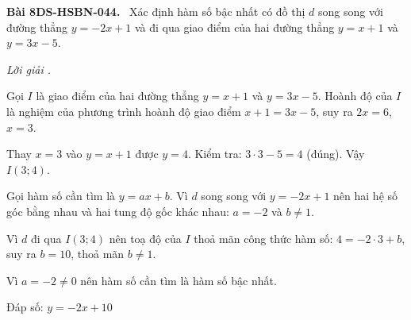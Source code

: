 \documentclass[12pt,a4paper]{article}
\newenvironment{problem}[1][]{\par\medskip\noindent\textbf{Bài #1.}\ }{\par}
\newenvironment{solution}[1][]{\par\noindent\textit{Lời giải #1.}\par}{\par}
\begin{document}
\begin{problem}[8DS-HSBN-044]
Xác định hàm số bậc nhất có đồ thị $d$ song song với đường thẳng $y = -2x + 1$ và đi qua giao điểm của hai đường thẳng $y = x + 1$ và $y = 3x - 5$.

\begin{solution}
Gọi $I$ là giao điểm của hai đường thẳng $y = x + 1$ và $y = 3x - 5$. Hoành độ của $I$ là nghiệm của phương trình hoành độ giao điểm $x + 1 = 3x - 5$, suy ra $2x = 6$, $x = 3$.

Thay $x = 3$ vào $y = x + 1$ được $y = 4$. Kiểm tra: $3 \cdot 3 - 5 = 4$ (đúng). Vậy $I(3; 4)$.

Gọi hàm số cần tìm là $y = ax + b$. Vì $d$ song song với $y = -2x + 1$ nên hai hệ số góc bằng nhau và hai tung độ gốc khác nhau: $a = -2$ và $b \neq 1$.

Vì $d$ đi qua $I(3; 4)$ nên toạ độ của $I$ thoả mãn công thức hàm số: $4 = -2 \cdot 3 + b$, suy ra $b = 10$, thoả mãn $b \neq 1$.

Vì $a = -2 \neq 0$ nên hàm số cần tìm là hàm số bậc nhất.

Đáp số: $\boxed{y = -2x + 10}$
\end{solution}
\end{problem}
\end{document}
